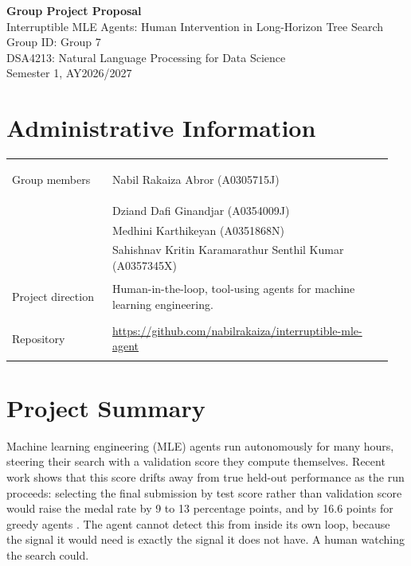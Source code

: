 \documentclass[11pt]{article}
\newcommand{\course}{DSA4213: Natural Language Processing for Data Science}
\newcommand{\semester}{Semester 1, AY2026/2027}
\begin{document}
\begin{center}
{\LARGE\bfseries Group Project Proposal}\\[0.4em]
{\large Interruptible MLE Agents: Human Intervention in Long-Horizon Tree Search}\\[0.9em]
Group ID: Group 7\\[0.9em]
\course\\
\semester
\end{center}

\section*{Administrative Information}

\begin{tabular}{@{}>{\bfseries\raggedright\arraybackslash}p{0.25\linewidth}
                    >{\raggedright\arraybackslash}p{0.70\linewidth}@{}}
Group members & Nabil Rakaiza Abror (A0305715J) \\
               & Dziand Dafi Ginandjar (A0354009J) \\
               & Medhini Karthikeyan (A0351868N) \\
               & Sahishnav Kritin Karamarathur Senthil Kumar (A0357345X) \\[0.7em]
Project direction & Human-in-the-loop, tool-using agents for machine learning
                    engineering. \\[0.7em]
Repository & \url{https://github.com/nabilrakaiza/interruptible-mle-agent} \\
\end{tabular}

\section*{Project Summary}

Machine learning engineering (MLE) agents run autonomously for many hours, steering
their search with a validation score they compute themselves. Recent work shows that
this score drifts away from true held-out performance as the run proceeds: selecting
the final submission by test score rather than validation score would raise the medal
rate by 9 to 13 percentage points, and by 16.6 points for greedy agents \cite{aira}.
The agent cannot detect this from inside its own loop, because the signal it would
need is exactly the signal it does not have. A human watching the search could.
\end{document}
